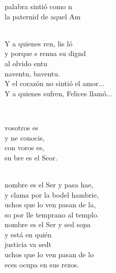 \documentclass[12pt]{article}
\begin{document}
\begin{multicols*}{2}
\begin{cancion}
	palabra sintió como n  \\
	la paternid de aquel Am \\\jump\\
	\begin{chorus}%
	Y a quienes ren, lis ló \\
	y porque s renua su dignd\\
	al olvido entu\\
	naventu, baventu.  \\
Y el corazón no sintió el amor...\\
Y a quienes sufren, Felices llamó...\\
	\end{chorus}%
	\jump\\
\end{cancion}%

\begin{cancion}%
	\begin{chorus}%
	 vosotros es \\
	y ne conocis,\\
	con voros es, \\
	su bre es el Seor.\\
	\end{chorus}%
	\jump\\
	nombre es el Ser y pasa hae,\\
	y clama por la bodel hambrie,\\
	uchos que lo ven pasan de la,\\
	so por lle temprano al templo.\\
\jump
	nombre es el Ser y sed sopa\\
y está en quién \\
	justicia va sedt\\
	uchos que lo ven pasan de lo\\
	eces ocupa en sus rezos.\\
\end{cancion}%


\end{multicols*}
\end{document}
